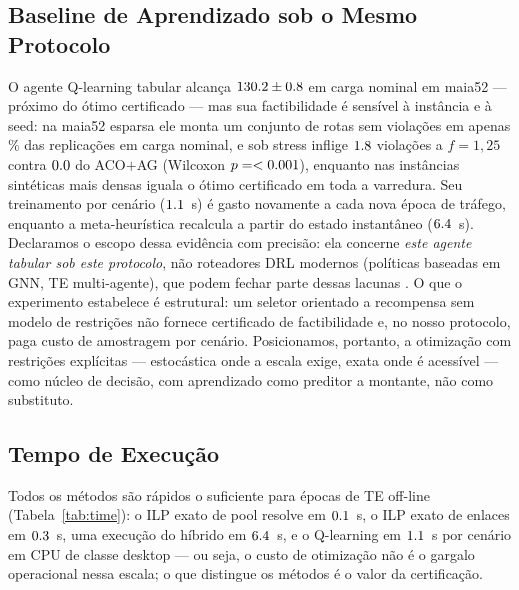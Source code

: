 \documentclass[journal]{IEEEtran}
\begin{document}
\subsection{Baseline de Aprendizado sob o Mesmo Protocolo}
\label{sec:qlb}
O agente Q-learning tabular alcança $130.2\pm0.8$ em carga
nominal em maia52 --- próximo do ótimo certificado --- mas sua factibilidade
é sensível à instância e à seed: na maia52 esparsa ele monta um conjunto de
rotas sem violações em apenas \QlFeasNominal\% das replicações em carga
nominal, e sob stress inflige $1.8$ violações a $f=1{,}25$ contra
$0.0$ do ACO$+$AG (Wilcoxon $p=<0.001$), enquanto nas instâncias
sintéticas mais densas iguala o ótimo certificado em toda a varredura. Seu
treinamento por cenário ($1.1$~s) é gasto novamente a cada nova época de
tráfego, enquanto a meta-heurística recalcula a partir do estado
instantâneo ($6.4$~s). Declaramos o escopo dessa evidência com precisão: ela
concerne \emph{este agente tabular sob este protocolo}, não roteadores DRL
modernos (políticas baseadas em GNN, TE multi-agente), que podem fechar
parte dessas lacunas
\cite{xu2018experience,stampa2017drl,almasan2022drl}. O que o experimento
estabelece é estrutural: um seletor orientado a recompensa sem modelo de
restrições não fornece certificado de factibilidade e, no nosso protocolo,
paga custo de amostragem por cenário. Posicionamos, portanto, a otimização
com restrições explícitas --- estocástica onde a escala exige, exata onde é
acessível --- como núcleo de decisão, com aprendizado como preditor a
montante, não como substituto.

\subsection{Tempo de Execução}
Todos os métodos são rápidos o suficiente para épocas de TE off-line
(Tabela~\ref{tab:time}): o ILP exato de pool resolve em $0.1$~s, o ILP
exato de enlaces em $0.3$~s, uma execução do híbrido em $6.4$~s, e
o Q-learning em $1.1$~s por cenário em CPU de classe desktop --- ou
seja, o custo de otimização não é o gargalo operacional nessa escala; o que
distingue os métodos é o valor da certificação.

\begin{table}[!t]
\caption{Tempo de relógio mediano por decisão completa de roteamento (s).}
\label{tab:time}
\centering

\end{table}
\end{document}
